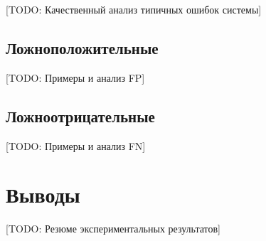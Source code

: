 [TODO: Качественный анализ типичных ошибок системы]

\subsection{Ложноположительные}
\label{subsec:exp:false_positives}

[TODO: Примеры и анализ FP]

\subsection{Ложноотрицательные}
\label{subsec:exp:false_negatives}

[TODO: Примеры и анализ FN]

\section{Выводы}
\label{sec:exp:conclusions}

[TODO: Резюме экспериментальных результатов]
